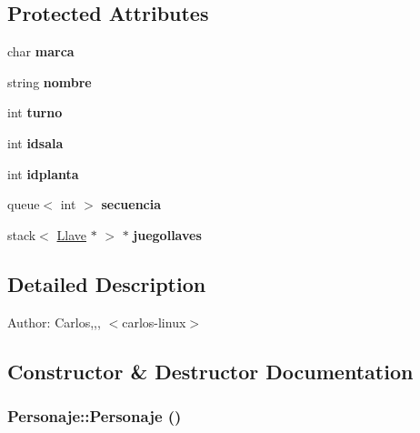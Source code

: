 \subsection*{Protected Attributes}
\begin{CompactItemize}
\item 
\hypertarget{classPersonaje_8f20063ad43d9f85a6d1f0022d32e0b4}{
char \textbf{marca}}
\label{classPersonaje_8f20063ad43d9f85a6d1f0022d32e0b4}

\item 
\hypertarget{classPersonaje_0c1fedf7d7ec93a6ca1d38aa6a79b7e2}{
string \textbf{nombre}}
\label{classPersonaje_0c1fedf7d7ec93a6ca1d38aa6a79b7e2}

\item 
\hypertarget{classPersonaje_0bce8e11746271ccf72035ea3da1138e}{
int \textbf{turno}}
\label{classPersonaje_0bce8e11746271ccf72035ea3da1138e}

\item 
\hypertarget{classPersonaje_31a8a079b785a74622cc8dd51a9f745c}{
int \textbf{idsala}}
\label{classPersonaje_31a8a079b785a74622cc8dd51a9f745c}

\item 
\hypertarget{classPersonaje_8160f258ed0b5836b1173cbef638bde3}{
int \textbf{idplanta}}
\label{classPersonaje_8160f258ed0b5836b1173cbef638bde3}

\item 
\hypertarget{classPersonaje_ea1a86738c789e65792ed745039bce46}{
queue$<$ int $>$ \textbf{secuencia}}
\label{classPersonaje_ea1a86738c789e65792ed745039bce46}

\item 
\hypertarget{classPersonaje_e98a94dc9f84d09e3a62266d5cac700c}{
stack$<$ \hyperlink{classLlave}{Llave} $\ast$ $>$ $\ast$ \textbf{juegollaves}}
\label{classPersonaje_e98a94dc9f84d09e3a62266d5cac700c}

\end{CompactItemize}


\subsection{Detailed Description}
\begin{Desc}
\item[Author:]Carlos,,, $<$carlos-linux$>$ \end{Desc}


\subsection{Constructor \& Destructor Documentation}
\hypertarget{classPersonaje_9238a75aae652b20dd423e85cfa1ee17}{
\subsubsection[Personaje]{\setlength{\rightskip}{0pt plus 5cm}Personaje::Personaje ()}}
\label{classPersonaje_9238a75aae652b20dd423e85cfa1ee17}


